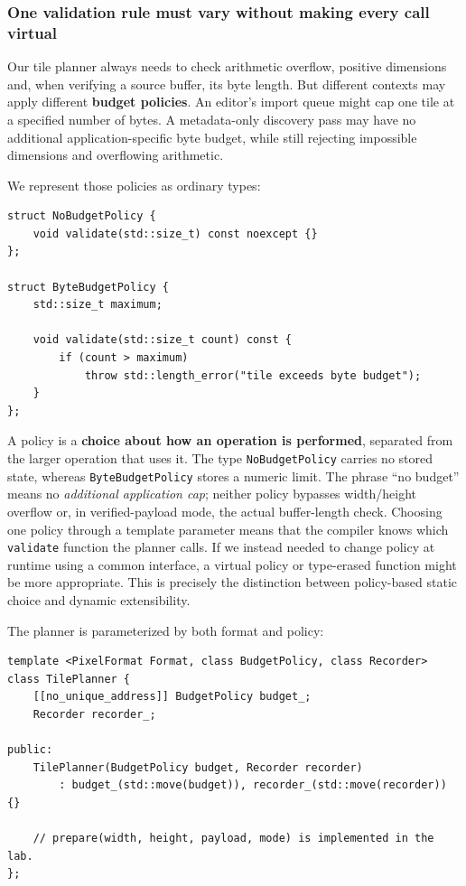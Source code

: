 \subsubsection{One validation rule must vary without making every call virtual}\label{one-validation-rule-must-vary-without-making-every-call-virtual}

Our tile planner always needs to check arithmetic overflow, positive dimensions and, when verifying a source buffer, its byte length. But different contexts may apply different \textbf{budget policies}. An editor's import queue might cap one tile at a specified number of bytes. A metadata-only discovery pass may have no additional application-specific byte budget, while still rejecting impossible dimensions and overflowing arithmetic.

We represent those policies as ordinary types:

\begin{verbatim}
struct NoBudgetPolicy {
    void validate(std::size_t) const noexcept {}
};

struct ByteBudgetPolicy {
    std::size_t maximum;

    void validate(std::size_t count) const {
        if (count > maximum)
            throw std::length_error("tile exceeds byte budget");
    }
};
\end{verbatim}

A policy is a \textbf{choice about how an operation is performed}, separated from the larger operation that uses it. The type \texttt{NoBudgetPolicy} carries no stored state, whereas \texttt{ByteBudgetPolicy} stores a numeric limit. The phrase ``no budget'' means no \emph{additional application cap}; neither policy bypasses width/height overflow or, in verified-payload mode, the actual buffer-length check. Choosing one policy through a template parameter means that the compiler knows which \texttt{validate} function the planner calls. If we instead needed to change policy at runtime using a common interface, a virtual policy or type-erased function might be more appropriate. This is precisely the distinction between policy-based static choice and dynamic extensibility.

The planner is parameterized by both format and policy:

\begin{verbatim}
template <PixelFormat Format, class BudgetPolicy, class Recorder>
class TilePlanner {
    [[no_unique_address]] BudgetPolicy budget_;
    Recorder recorder_;

public:
    TilePlanner(BudgetPolicy budget, Recorder recorder)
        : budget_(std::move(budget)), recorder_(std::move(recorder)) {}

    // prepare(width, height, payload, mode) is implemented in the lab.
};
\end{verbatim}

